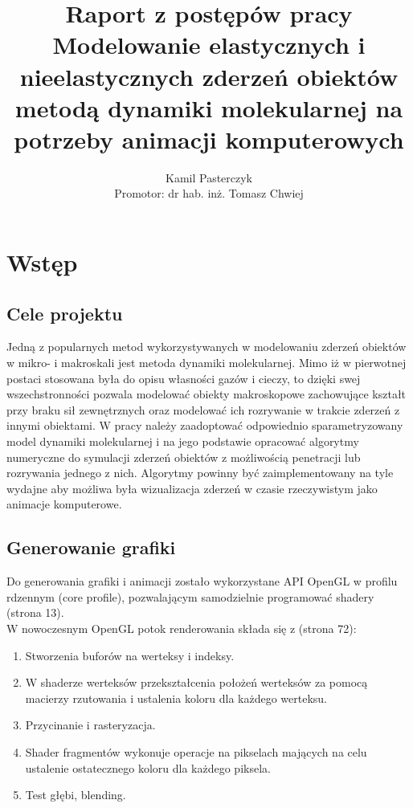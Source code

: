 \documentclass[12pt, letterpaper]{report}
\title{
    Raport z postępów pracy \\
    \large Modelowanie elastycznych i nieelastycznych
    zderzeń obiektów\\
    metodą dynamiki molekularnej na potrzeby animacji
    komputerowych
}
\author{
    Kamil Pasterczyk \\
    \small Promotor: dr hab. inż. Tomasz Chwiej
}
\begin{document}
\maketitle
\tableofcontents

\chapter{Wstęp}
    \section{Cele projektu}
    Jedną z popularnych metod wykorzystywanych w modelowaniu zderzeń obiektów w mikro- i makroskali jest 
    metoda dynamiki molekularnej. Mimo iż w pierwotnej postaci stosowana była do opisu własności gazów i 
    cieczy, to dzięki swej wszechstronności pozwala modelować obiekty makroskopowe zachowujące kształt 
    przy braku sił zewnętrznych oraz modelować ich rozrywanie w trakcie zderzeń z innymi obiektami. W pracy 
    należy zaadoptować odpowiednio sparametryzowany model dynamiki molekularnej i na jego podstawie opracować 
    algorytmy numeryczne do symulacji zderzeń obiektów z możliwością penetracji lub rozrywania jednego z nich. 
    Algorytmy powinny być zaimplementowany na tyle wydajne aby możliwa była wizualizacja zderzeń w czasie 
    rzeczywistym jako animacje komputerowe.

    \section{Generowanie grafiki}
    Do generowania grafiki i animacji zostało wykorzystane API OpenGL w profilu rdzennym (core profile), 
    pozwalającym samodzielnie programować shadery \cite{grafika3d} (strona 13). \\

    W nowoczesnym OpenGL potok renderowania składa się z \cite{grafika3d} (strona 72):
    \begin{enumerate}
        \item Stworzenia buforów na werteksy i indeksy.
        \item W shaderze werteksów przekształcenia położeń werteksów 
        za pomocą macierzy rzutowania i ustalenia koloru dla każdego werteksu.
        \item Przycinanie i rasteryzacja.
        \item Shader fragmentów wykonuje operacje na pikselach mających na celu 
        ustalenie ostatecznego koloru dla każdego piksela.
        \item Test głębi, blending.
    \end{enumerate}
\end{document}
